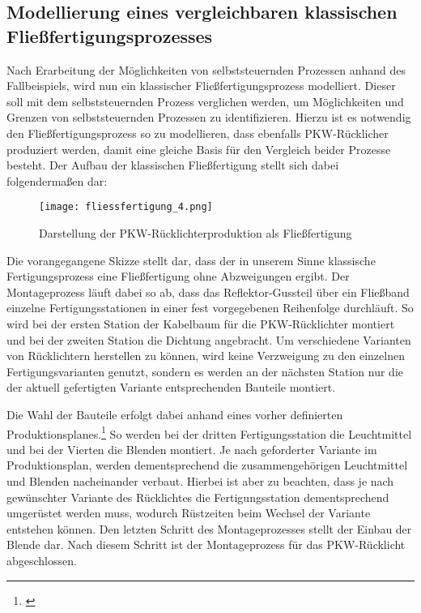 \subsection{Modellierung eines vergleichbaren klassischen Fließfertigungsprozesses}
\label{Modellierung}

Nach Erarbeitung der Möglichkeiten von selbststeuernden Prozessen anhand des
Fallbeispiels, wird nun ein klassischer Fließfertigungsprozess modelliert.
Dieser soll mit dem selbststeuernden Prozess verglichen werden, um Möglichkeiten
und Grenzen von selbststeuernden Prozessen zu identifizieren. Hierzu ist es
notwendig den Fließfertigungsprozess so zu modellieren, dass ebenfalls
PKW-Rücklicher produziert werden, damit eine gleiche Basis für den Vergleich
beider Prozesse besteht. Der Aufbau der klassischen Fließfertigung stellt sich
dabei folgendermaßen dar:

\begin{figure}[htb] 
\centering
\texttt{[image: fliessfertigung\_4.png]}
\caption[Montagestation]{Darstellung der PKW-Rücklichterproduktion als Fließfertigung\protect\footnotemark}
\label{fig:Fliessfertigung}
\end{figure}

Die vorangegangene Skizze stellt dar, dass der in unserem Sinne klassische
Fertigungsprozess eine Fließfertigung ohne Abzweigungen ergibt. Der
Montageprozess läuft dabei so ab, dass das Reflektor-Gussteil über ein Fließband
einzelne Fertigungsstationen in einer fest vorgegebenen Reihenfolge durchläuft.
So wird bei der ersten Station der Kabelbaum für die PKW-Rücklichter montiert
und bei der zweiten Station die Dichtung angebracht. Um verschiedene Varianten
von Rücklichtern herstellen zu können, wird keine Verzweigung zu den einzelnen
Fertigungsvarianten genutzt, sondern es werden an der nächsten Station nur die
der aktuell gefertigten Variante entsprechenden Bauteile montiert.

Die Wahl der Bauteile erfolgt dabei anhand eines vorher definierten
Produktionsplanes.\footnote{\citet[S.~331]{arnold2008}} So werden bei der
dritten Fertigungsstation die Leuchtmittel und bei der Vierten die Blenden montiert. Je nach geforderter Variante im
Produktionsplan, werden dementsprechend die zusammengehörigen Leuchtmittel und
Blenden nacheinander verbaut. Hierbei ist aber zu beachten, dass je nach
gewünschter Variante des Rücklichtes die Fertigungsstation dementsprechend
umgerüstet werden muss, wodurch Rüstzeiten beim Wechsel der Variante entstehen
können. Den letzten Schritt des Montageprozesses stellt der Einbau der Blende
dar. Nach diesem Schritt ist der Montageprozess für das PKW-Rücklicht
abgeschlossen.
 